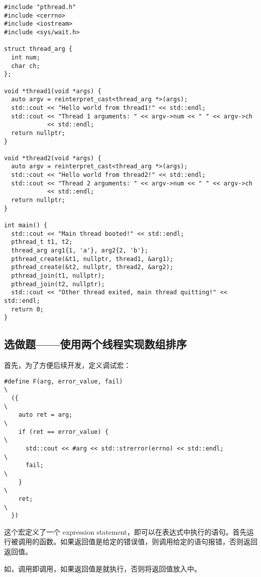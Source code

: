 \documentclass{ctexrep}
\begin{document}
\begin{verbatim}
#include "pthread.h"
#include <cerrno>
#include <iostream>
#include <sys/wait.h>

struct thread_arg {
  int num;
  char ch;
};

void *thread1(void *args) {
  auto argv = reinterpret_cast<thread_arg *>(args);
  std::cout << "Hello world from thread1!" << std::endl;
  std::cout << "Thread 1 arguments: " << argv->num << " " << argv->ch
            << std::endl;
  return nullptr;
}

void *thread2(void *args) {
  auto argv = reinterpret_cast<thread_arg *>(args);
  std::cout << "Hello world from thread2!" << std::endl;
  std::cout << "Thread 2 arguments: " << argv->num << " " << argv->ch
            << std::endl;
  return nullptr;
}

int main() {
  std::cout << "Main thread booted!" << std::endl;
  pthread_t t1, t2;
  thread_arg arg1{1, 'a'}, arg2{2, 'b'};
  pthread_create(&t1, nullptr, thread1, &arg1);
  pthread_create(&t2, nullptr, thread2, &arg2);
  pthread_join(t1, nullptr);
  pthread_join(t2, nullptr);
  std::cout << "Other thread exited, main thread quitting!" << std::endl;
  return 0;
}
\end{verbatim}

\subsection{选做题——使用两个线程实现数组排序}

首先，为了方便后续开发，定义调试宏：
\begin{verbatim}
#define F(arg, error_value, fail)                                              \
  ({                                                                           \
    auto ret = arg;                                                            \
    if (ret == error_value) {                                                  \
      std::cout << #arg << std::strerror(errno) << std::endl;                  \
      fail;                                                                    \
    }                                                                          \
    ret;                                                                       \
  })
\end{verbatim}
这个宏定义了一个 expression statement，即可以在表达式中执行的语句。首先运行被调用的函数。如果返回值是给定的错误值，则调用给定的语句报错，否则返回返回值。

如，调用即调用，如果返回值是就执行，否则将返回值放入中。
\end{document}
